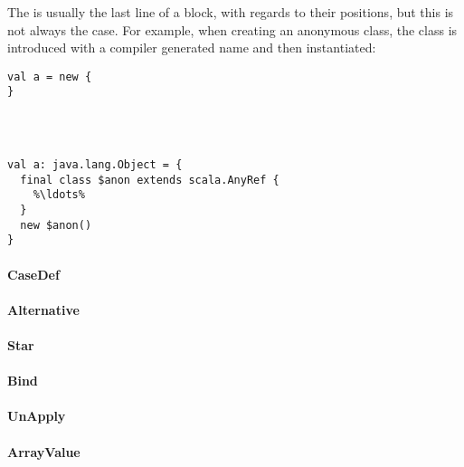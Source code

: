 The  is usually the last line of a block, with regards to their positions, but this is not always the case. For example, when creating an anonymous class, the class is introduced with a compiler generated name and then instantiated:

\begin{multicols}{2}
\begin{lstlisting}
val a = new {
}




\end{lstlisting}
\begin{lstlisting}
val a: java.lang.Object = {
  final class $anon extends scala.AnyRef {
    %\ldots%
  }
  new $anon()
}
\end{lstlisting}
\end{multicols}



\paragraph{CaseDef} 

\paragraph{Alternative} 

\paragraph{Star} 

\paragraph{Bind} 

\paragraph{UnApply} 

\paragraph{ArrayValue} 

